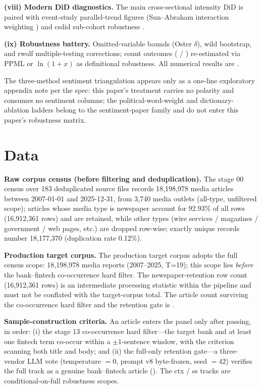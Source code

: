 \textbf{(viii) Modern DiD diagnostics.} The main cross-sectional intensity
DiD is paired with event-study parallel-trend figures (Sun--Abraham
interaction weighting \parencite{sun2021estimating}) and csdid sub-cohort
robustness \parencite{callaway2021difference}.

\textbf{(ix) Robustness battery.} Omitted-variable bounds (Oster $\delta$),
wild bootstrap, and rwolf multiple-testing corrections; count outcomes
( / ) re-estimated via
PPML or $\ln(1+x)$ as definitional robustness. All numerical results are
.

The three-method sentiment triangulation appears only as a one-line
exploratory appendix note per the spec: this paper's treatment carries no
polarity and consumes no sentiment columns; the political-word-weight and
dictionary-ablation ladders belong to the sentiment-paper family and do not
enter this paper's robustness matrix.

\section{Data}\label{sec:data}

\textbf{Raw corpus census (before filtering and deduplication).} The stage 00
census over 183 deduplicated source files records 18{,}198{,}978 media
articles between 2007-01-01 and 2025-12-31, from 3{,}740 media outlets
(all-type, unfiltered scope); articles whose media type is newspaper account
for 92.93\% of all rows (16{,}912{,}361 rows) and are retained, while other
types (wire services / magazines / government / web pages, etc.) are dropped
row-wise; exactly unique records number 18{,}177{,}370 (duplication rate
0.12\%).

\textbf{Production target corpus.} The production target corpus adopts the
full census scope: 18{,}198{,}978 media reports (2007--2025, T=19); this
scope lies \emph{before} the bank--fintech co-occurrence hard filter. The
newspaper-retention row count (16{,}912{,}361 rows) is an intermediate
processing statistic within the pipeline and must not be conflated with the
target-corpus total. The
article count surviving the co-occurrence hard filter and the retention gate
is .

\textbf{Sample-construction criteria.} An article enters the panel only after
passing, in order: (i) the stage 13 co-occurrence hard filter---the target
bank and at least one fintech term co-occur within a $\pm 1$-sentence window,
with the criterion scanning both title and body; and (ii) the full-only
retention gate---a three-vendor LLM vote (temperature $= 0$, prompt v8
byte-frozen, seed $= 42$) verifies the full track as a genuine bank--fintech
article (). The ctx / ss tracks are
conditional-on-full robustness scopes.

